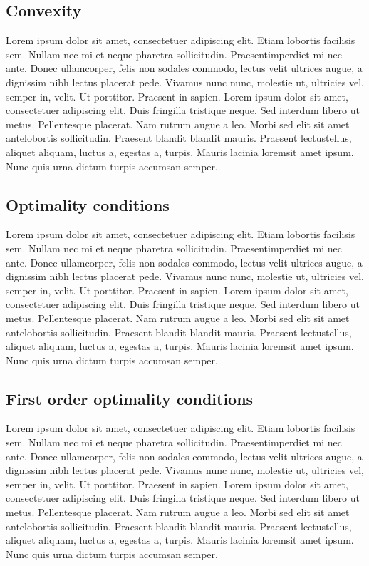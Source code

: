 \subsection{Convexity}

Lorem ipsum dolor sit amet, consectetuer adipiscing elit. Etiam lobortis facilisis sem. Nullam nec mi et neque pharetra sollicitudin. Praesentimperdiet mi nec ante. Donec ullamcorper, felis non sodales commodo, lectus velit ultrices augue, a dignissim nibh lectus placerat pede. Vivamus nunc nunc, molestie ut, ultricies vel, semper in, velit. Ut porttitor. Praesent in sapien. Lorem ipsum dolor sit amet, consectetuer adipiscing elit. Duis fringilla tristique neque. Sed interdum libero ut metus. Pellentesque placerat. Nam rutrum augue a leo. Morbi sed elit sit amet antelobortis sollicitudin. Praesent blandit blandit mauris. Praesent lectustellus, aliquet aliquam, luctus a, egestas a, turpis. Mauris lacinia loremsit amet ipsum. Nunc quis urna dictum turpis accumsan semper.

\subsection{Optimality conditions}

Lorem ipsum dolor sit amet, consectetuer adipiscing elit. Etiam lobortis facilisis sem. Nullam nec mi et neque pharetra sollicitudin. Praesentimperdiet mi nec ante. Donec ullamcorper, felis non sodales commodo, lectus velit ultrices augue, a dignissim nibh lectus placerat pede. Vivamus nunc nunc, molestie ut, ultricies vel, semper in, velit. Ut porttitor. Praesent in sapien. Lorem ipsum dolor sit amet, consectetuer adipiscing elit. Duis fringilla tristique neque. Sed interdum libero ut metus. Pellentesque placerat. Nam rutrum augue a leo. Morbi sed elit sit amet antelobortis sollicitudin. Praesent blandit blandit mauris. Praesent lectustellus, aliquet aliquam, luctus a, egestas a, turpis. Mauris lacinia loremsit amet ipsum. Nunc quis urna dictum turpis accumsan semper.

\subsection{First order optimality conditions}

Lorem ipsum dolor sit amet, consectetuer adipiscing elit. Etiam lobortis facilisis sem. Nullam nec mi et neque pharetra sollicitudin. Praesentimperdiet mi nec ante. Donec ullamcorper, felis non sodales commodo, lectus velit ultrices augue, a dignissim nibh lectus placerat pede. Vivamus nunc nunc, molestie ut, ultricies vel, semper in, velit. Ut porttitor. Praesent in sapien. Lorem ipsum dolor sit amet, consectetuer adipiscing elit. Duis fringilla tristique neque. Sed interdum libero ut metus. Pellentesque placerat. Nam rutrum augue a leo. Morbi sed elit sit amet antelobortis sollicitudin. Praesent blandit blandit mauris. Praesent lectustellus, aliquet aliquam, luctus a, egestas a, turpis. Mauris lacinia loremsit amet ipsum. Nunc quis urna dictum turpis accumsan semper.

